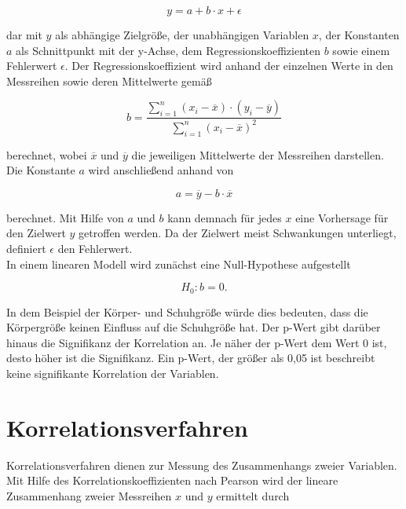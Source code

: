 \begin{equation}
y = a + b \cdot x + \epsilon
	\label{eq:linreg}
\end{equation}

dar mit $y$ als abhängige Zielgröße, der unabhängigen Variablen $x$, der Konstanten $a$ als Schnittpunkt mit der y-Achse, dem Regressionskoeffizienten $b$ sowie einem Fehlerwert $\epsilon$. Der Regressionskoeffizient wird anhand der einzelnen Werte in den Messreihen sowie deren Mittelwerte gemäß

\begin{equation}
b = \frac{\sum \limits_{i=1}^n(x_i-\overline{x}) \cdot (y_i-\overline{y})}{\sum \limits_{i=1}^n(x_i-\overline{x})^2} 
	\label{eq:regcoef}
\end{equation}

berechnet, wobei $\overline{x}$ und $\overline{y}$ die jeweiligen Mittelwerte der Messreihen darstellen. Die Konstante $a$ wird anschließend anhand von 

\begin{equation}
a = \overline{y} - b \cdot \overline{x}
	\label{eq:konstante}
\end{equation}

berechnet. Mit Hilfe von $a$ und $b$ kann demnach für jedes $x$ eine Vorhersage für den Zielwert $y$ getroffen werden. Da der Zielwert meist Schwankungen unterliegt, definiert $\epsilon$ den Fehlerwert. \parencite{frank_einfach_2006}\\

In einem linearen Modell wird zunächst eine Null-Hypothese aufgestellt 

\begin{equation}
H_0: b = 0.
	\label{eq:null-hypo}
\end{equation}

In dem Beispiel der Körper- und Schuhgröße würde dies bedeuten, dass die Körpergröße keinen Einfluss auf die Schuhgröße hat. Der p-Wert gibt darüber hinaus die Signifikanz der Korrelation an. Je näher der p-Wert dem Wert 0 ist, desto höher ist die Signifikanz. Ein p-Wert, der größer als 0,05 ist beschreibt keine signifikante Korrelation der Variablen.  

\section{Korrelationsverfahren}

Korrelationsverfahren dienen zur Messung des Zusammenhangs zweier Variablen. Mit Hilfe des Korrelationskoeffizienten nach Pearson wird der lineare Zusammenhang zweier Messreihen $x$ und $y$ ermittelt durch

